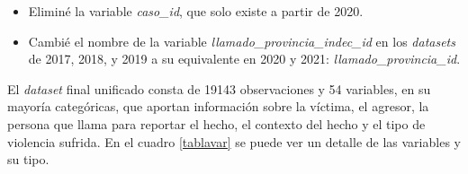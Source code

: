 \documentclass[10 pt]{article}
\begin{document}
\begin{itemize}
    \item Eliminé la variable \textit{caso\_id}, que solo existe a partir de 2020.
    \item Cambié el nombre de la variable \textit{llamado\_provincia\_indec\_id} en los \textit{datasets} de 2017, 2018, y 2019 a su equivalente en 2020 y 2021: \textit{llamado\_provincia\_id}.
\end{itemize}


El \textit{dataset} final unificado consta de 19143 observaciones y 54 variables, en su mayoría categóricas, que aportan información sobre la víctima, el agresor, la persona que llama para reportar el hecho, el contexto del hecho y el tipo de violencia sufrida. En el cuadro \ref{tablavar} se puede ver un detalle de las variables y su tipo.
\end{document}
